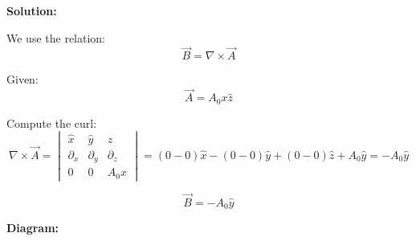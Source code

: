 \documentclass[12pt]{article}
\begin{document}
\textbf{Solution:}

We use the relation:
\[
\vec{B} = \nabla \times \vec{A}
\]

Given:
\[
\vec{A} = A_0 x \hat{z}
\]

Compute the curl:
\[
\nabla \times \vec{A} =
\begin{vmatrix}
\hat{x} & \hat{y} & \hat{z} \\
\partial_x & \partial_y & \partial_z \\
0 & 0 & A_0 x
\end{vmatrix}
= \left( 0 - 0 \right)\hat{x} - \left( 0 - 0 \right)\hat{y} + \left( 0 - 0 \right)\hat{z} + A_0 \hat{y}
= -A_0 \hat{y}
\]

\begin{tcolorbox}
\[
\boxed{\vec{B} = -A_0 \hat{y}}
\]
\end{tcolorbox}

\textbf{Diagram:}
\begin{center}
\end{center}
\end{document}
